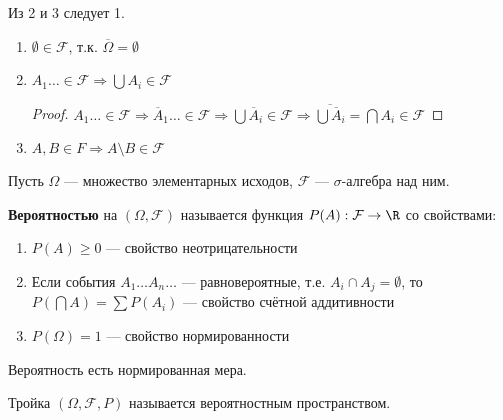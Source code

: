 \documentclass[12pt, a4paper, oneside]{book}
\begin{document}
\begin{remark}
    Из 2 и 3 следует 1.
\end{remark}

\begin{prop}\itemfix
    \begin{enumerate}
        \item \(\emptyset \in \mathcal{F}\), т.к. \(\overline \Omega = \emptyset\)
        \item \(A_1 \dots \in \mathcal{F} \Rightarrow \bigcup A_i \in \mathcal{F}\)

              \begin{proof}
                  \(A_1 \dots \in \mathcal{F} \Rightarrow \overline A_1 \dots \in \mathcal{F} \Rightarrow \bigcup \overline A_i \in \mathcal{F} \Rightarrow \overline{\bigcup \overline A_i} = \bigcap A_i \in \mathcal{F}\)
              \end{proof}

        \item \(A, B \in F \Rightarrow A\setminus B \in \mathcal{F}\)
    \end{enumerate}
\end{prop}

\? %

\begin{definition}
    Пусть \(\Omega\) --- множество элементарных исходов, \(\mathcal{F}\) --- \(\sigma\)-алгебра над ним.

    \textbf{Вероятностью} на \((\Omega, \mathcal{F})\) называется функция \(P(A) : \mathcal{F} \to \R\) со свойствами:
    \begin{enumerate}
        \item \(P(A) \geq 0\) --- свойство неотрицательности
        \item Если события \(A_1 \dots A_n \dots \) --- равновероятные, т.е. \(A_i \cap A_j = \emptyset\), то \(P(\bigcap A) = \sum P(A_i)\) --- свойство счётной аддитивности
        \item \(P(\Omega) = 1\) --- свойство нормированности
    \end{enumerate}
\end{definition}

\begin{remark}
    Вероятность есть нормированная мера.
\end{remark}

\begin{definition}
    Тройка \((\Omega, \mathcal{F}, P)\) называется вероятностным пространством.
\end{definition}
\end{document}

